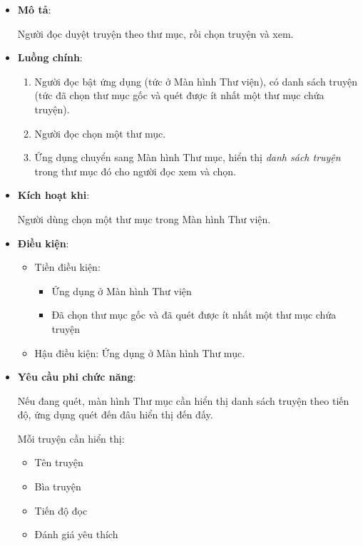 \documentclass[../../thesis]{subfiles}
\begin{document}
\begin{itemize}
    \item
        \textbf{Mô tả}:

        Người đọc duyệt truyện theo thư mục, rồi chọn truyện và xem.
    \item
        \textbf{Luồng chính}:

        \begin{enumerate}
            \item
                Người đọc bật ứng dụng (tức ở Màn hình Thư viện), có danh sách
                truyện (tức đã chọn thư mục gốc và quét được ít nhất một thư mục
                chứa truyện).
            \item
                Người đọc chọn một thư mục.
            \item
                Ứng dụng chuyển sang Màn hình Thư mục, hiển thị \emph{danh sách
                truyện} trong thư mục đó cho người đọc xem và chọn.
        \end{enumerate}
    \item
        \textbf{Kích hoạt khi}:

        Người dùng chọn một thư mục trong Màn hình Thư viện.
    \item
        \textbf{Điều kiện}:

        \begin{itemize}
            \item
                Tiền điều kiện:

                \begin{itemize}
                    \item
                        Ứng dụng ở Màn hình Thư viện
                    \item
                        Đã chọn thư mục gốc và đã quét được ít nhất một thư mục
                        chứa truyện
                \end{itemize}
            \item
                Hậu điều kiện: Ứng dụng ở Màn hình Thư mục.
        \end{itemize}
    \item
        \textbf{Yêu cầu phi chức năng}:

        Nếu đang quét, màn hình Thư mục cần hiển thị danh sách truyện theo tiến
        độ, ứng dụng quét đến đâu hiển thị đến đấy.

        Mỗi truyện cần hiển thị:

        \begin{itemize}
            \item
                Tên truyện
            \item
                Bìa truyện
            \item
                Tiến độ đọc
            \item
                Đánh giá yêu thích
        \end{itemize}
  \end{itemize}
\end{document}
